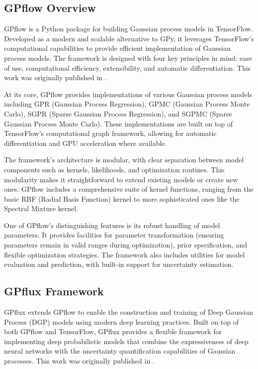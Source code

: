 \subsection{GPflow Overview}

GPflow is a Python package for building Gaussian process models in
TensorFlow. Developed as a modern and scalable alternative to GPy, it
leverages TensorFlow's computational capabilities to provide
efficient implementation of Gaussian process models. The framework is
designed with four key principles in mind: ease of use, computational
efficiency, extensibility, and automatic differentiation. This work
was originally published in \cite{MatthewsEtAl2016}.

At its core, GPflow provides implementations of various Gaussian
process models including GPR (Gaussian Process Regression), GPMC
(Gaussian Process Monte Carlo), SGPR (Sparse Gaussian Process
Regression), and SGPMC (Sparse Gaussian Process Monte Carlo). These
implementations are built on top of TensorFlow's computational graph
framework, allowing for automatic differentiation and GPU
acceleration where available.

The framework's architecture is modular, with clear separation
between model components such as kernels, likelihoods, and
optimization routines. This modularity makes it straightforward to
extend existing models or create new ones. GPflow includes a
comprehensive suite of kernel functions, ranging from the basic RBF
(Radial Basis Function) kernel to more sophisticated ones like the
Spectral Mixture kernel.

One of GPflow's distinguishing features is its robust handling of
model parameters. It provides facilities for parameter transformation
(ensuring parameters remain in valid ranges during optimization),
prior specification, and flexible optimization strategies. The
framework also includes utilities for model evaluation and
prediction, with built-in support for uncertainty estimation.

\subsection{GPflux Framework}

GPflux extends GPflow to enable the construction and training of Deep
Gaussian Process (DGP) models using modern deep learning practices.
Built on top of both GPflow and TensorFlow, GPflux provides a
flexible framework for implementing deep probabilistic models that
combine the expressiveness of deep neural networks with the
uncertainty quantification capabilities of Gaussian processes. This
work was originally published in \cite{DutordoirEtAl2021}.

